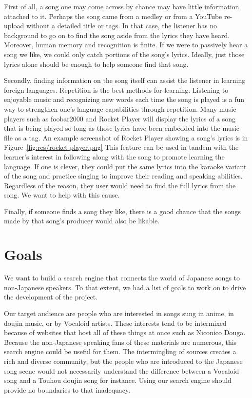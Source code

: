 \documentclass{acm} %
\begin{document}
\begin{CJK}{UTF8}{zhsong}
First of all, a song one may come across by chance may have little information attached to it. Perhaps the song came from a medley or from a YouTube re-upload without a detailed title or tags. In that case, the listener has no background to go on to find the song aside from the lyrics they have heard. Moreover, human memory and recognition is finite. If we were to passively hear a song we like, we could only catch portions of the song's lyrics. Ideally, just those lyrics alone should be enough to help someone find that song.

Secondly, finding information on the song itself can assist the listener in learning foreign languages. Repetition is the best methods for learning. Listening to enjoyable music and recognizing new words each time the song is played is a fun way to strengthen one's language capabilities through repetition. Many music players such as foobar2000 and Rocket Player will display the lyrics of a song that is being played so long as those lyrics have been embedded into the music file as a tag. An example screenshot of Rocket Player showing a song's lyrics is in Figure~\ref{fig:res/rocket-player.png} This feature can be used in tandem with the learner's interest in following along with the song to promote learning the language. If one is clever, they could put the same lyrics into the karaoke variant of the song and practice singing to improve their reading and speaking abilities. Regardless of the reason, they user would need to find the full lyrics from the song. We want to help with this cause.


Finally, if someone finds a song they like, there is a good chance that the songs made by that song's producer would also be likable. 

\section{Goals}

We want to build a search engine that connects the world of Japanese songs to non-Japanese speakers. To that extent, we had a list of goals to work on to drive the development of the project.

Our target audience are people who are interested in songs sung in anime, in doujin music, or by Vocaloid artists. These interests tend to be intermixed because of websites that host all of these things at once such as Niconico Douga. Because the non-Japanese speaking fans of these materials are numerous, this search engine could be useful for them. The intermingling of sources creates a rich and diverse community, but the people who are introduced to the Japanese song scene would not necessarily understand the difference between a Vocaloid song and a Touhou doujin song for instance. Using our search engine should provide no boundaries to that inadequacy.


\end{CJK}
\end{document}
